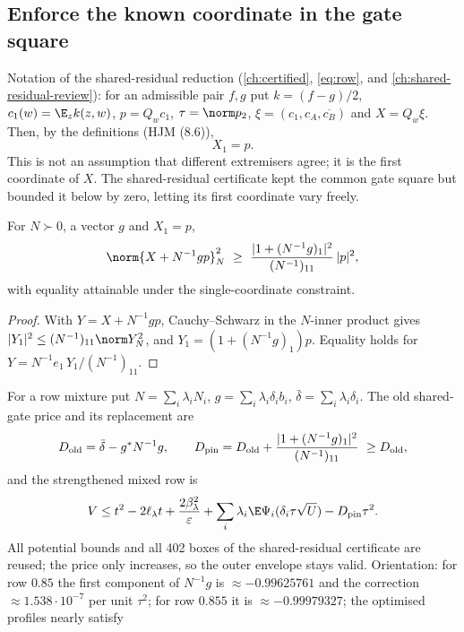\subsection{Enforce the known coordinate in the gate square}\label{sec:pinned-gate}
Notation of the shared-residual reduction (\autoref{ch:certified}, \eqref{eq:row}, and \autoref{ch:shared-residual-review}): for an admissible pair $f,g$ put $k=(f-g)/2$,
$c_1(w)=\E_zk(z,w)$, $p=Q_wc_1$, $\tau=\norm p_2$, $\xi=(c_1,c_A,\overline{c_B})$ and $X=Q_w\xi$. Then, by the definitions (HJM (8.6)),
\[
X_1=p .
\]
This is not an assumption that different extremisers agree; it is the first coordinate of $X$. The shared-residual certificate kept the common gate square but bounded it below by zero, letting
its first coordinate vary freely.
\begin{lemma}\label{lem:pinned}
For $N\succ0$, a vector $g$ and $X_1=p$,
\begin{equation}\label{eq:pinned1}
\norm{X+N^{-1}gp}_N^2\ \ge\ \frac{|1+(N^{-1}g)_1|^2}{(N^{-1})_{11}}\,|p|^2 ,
\end{equation}
with equality attainable under the single-coordinate constraint.
\end{lemma}
\begin{proof}With $Y=X+N^{-1}gp$, Cauchy--Schwarz in the $N$-inner product gives $|Y_1|^2\le(N^{-1})_{11}\norm Y_N^2$, and $Y_1=(1+(N^{-1}g)_1)p$. Equality holds for $Y=N^{-1}e_1\,Y_1/(N^{-1})_{11}$.\end{proof}
For a row mixture put $N=\sum_i\lambda_iN_i$, $g=\sum_i\lambda_i\delta_ib_i$, $\bar\delta=\sum_i\lambda_i\delta_i$. The old shared-gate price and its replacement are
\begin{equation}\label{eq:pinned2}
D_{\rm old}=\bar\delta-g^*N^{-1}g,\qquad D_{\rm pin}=D_{\rm old}+\frac{|1+(N^{-1}g)_1|^2}{(N^{-1})_{11}}\ \ge D_{\rm old},
\end{equation}
and the strengthened mixed row is
\begin{equation}\label{eq:pinned3}
V\le t^2-2\ell_\lambda t+\frac{2\beta_\lambda^2}\varepsilon+\sum_i\lambda_i\E\Psi_i(\delta_i\tau\sqrt U)-D_{\rm pin}\tau^2 .
\end{equation}
All potential bounds and all 402 boxes of the shared-residual certificate are reused; the price only increases, so the outer envelope stays valid. Orientation: for row $0.85$ the first
component of $N^{-1}g$ is $\approx-0.99625761$ and the correction $\approx1.538\cdot10^{-7}$ per unit $\tau^2$; for row $0.855$ it is $\approx-0.99979327$; the optimised profiles nearly satisfy
